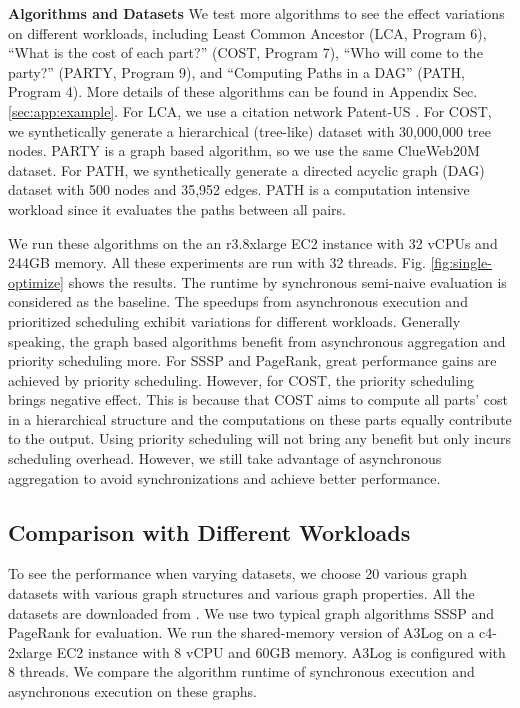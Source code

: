 \documentclass{vldb}
\begin{document}
\noindent\textbf{Algorithms and Datasets}
We test more algorithms to see the effect variations on different workloads, including Least Common Ancestor (LCA, Program 6), ``What is the cost of each part?'' (COST, Program 7), ``Who will come to the party?'' (PARTY, Program 9), and ``Computing Paths in a DAG'' (PATH, Program 4). More details of these algorithms can be found in Appendix Sec. \ref{sec:app:example}. For LCA, we use a citation network Patent-US \cite{konect}. For COST, we synthetically generate a hierarchical (tree-like) dataset with 30,000,000 tree nodes. PARTY is a graph based algorithm, so we use the same ClueWeb20M dataset. For PATH, we synthetically generate a directed acyclic graph (DAG) dataset with 500 nodes and 35,952 edges. PATH is a computation intensive workload since it evaluates the paths between all pairs.


We run these algorithms on the an r3.8xlarge EC2 instance with 32 vCPUs and 244GB memory. All these experiments are run with 32 threads. Fig. \ref{fig:single-optimize} shows the results. The runtime by synchronous semi-naive evaluation is considered as the baseline. The speedups from asynchronous execution and prioritized scheduling exhibit variations for different workloads. Generally speaking, the graph based algorithms benefit from asynchronous aggregation and priority scheduling more. For SSSP and PageRank, great performance gains are achieved by priority scheduling. However, for COST, the priority scheduling brings negative effect. This is because that COST aims to compute all parts' cost in a hierarchical structure and the computations on these parts equally contribute to the output. Using priority scheduling will not bring any benefit but only incurs scheduling overhead. However, we still take advantage of asynchronous aggregation to avoid synchronizations and achieve better performance.

\subsection{Comparison with Different Workloads}
\label{sec:expr:workloads}

To see the performance when varying datasets, we choose 20 various graph datasets with various graph structures and various graph properties. All the datasets are downloaded from \cite{konect}. We use two typical graph algorithms SSSP and PageRank for evaluation. We run the shared-memory version of A3Log on a c4-2xlarge EC2 instance with 8 vCPU and 60GB memory. A3Log is configured with 8 threads. We compare the algorithm runtime of synchronous execution and asynchronous execution on these graphs.
\end{document}
